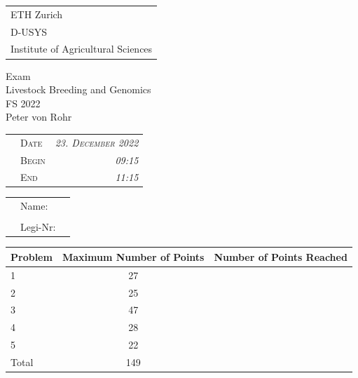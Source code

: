 \documentclass[
]{article}
\author{}
\date{\vspace{-2.5em}}
\begin{document}
\thispagestyle{empty}

\begin{tabular}{l}
ETH Zurich \\
D-USYS\\
Institute of Agricultural Sciences\\
\end{tabular}

\vspace{15ex}
\begin{center}
\huge
Exam\\ \vspace{1ex}
Livestock Breeding and Genomics \\  \vspace{1ex}
FS 2022 \\

\normalsize
\vspace{7ex}
Peter von Rohr 
\end{center}

\vspace{7ex}
\begin{tabular}{p{5cm}lr}
  & \textsc{Date}  & \textsc{\emph{23. December 2022}} \\
  & \textsc{Begin} & \textsc{\emph{09:15 }}\\
  & \textsc{End}   & \textsc{\emph{11:15 }}\\ 
\end{tabular}

\vspace{5ex}

\large
\begin{tabular}{p{2.5cm}p{3cm}p{6cm}}
  &  Name:     &  \\
  &            &  \\
  &  Legi-Nr:  & \\
\end{tabular}
\normalsize

\vspace{9ex}
\begin{center}
\begin{tabular}{|p{3cm}|c|c|}
\hline
Problem  &  Maximum Number of Points  &  Number of Points Reached \\
\hline
1        &  27         & \\
\hline
2        &  25         & \\
\hline
3        &  47         & \\
\hline
4        &  28          & \\
\hline
5        &  22          & \\
\hline
Total    &  149    & \\
\hline
\end{tabular}
\end{center}
\end{document}
